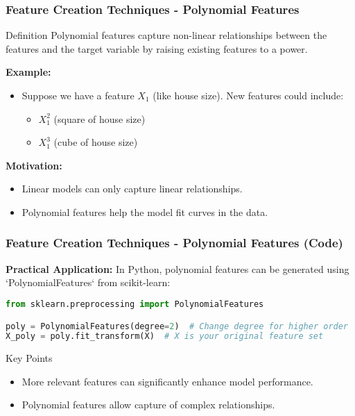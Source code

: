 \documentclass[aspectratio=169]{beamer}
\begin{document}
\begin{frame}[fragile]
    \frametitle{Feature Creation Techniques - Polynomial Features}
    \begin{block}{Definition}
        Polynomial features capture non-linear relationships between the features and the target variable by raising existing features to a power.
    \end{block}

    \textbf{Example:}
    \begin{itemize}
        \item Suppose we have a feature \(X_1\) (like house size). New features could include:
        \begin{itemize}
            \item \(X_1^2\) (square of house size)
            \item \(X_1^3\) (cube of house size)
        \end{itemize}
    \end{itemize}

    \textbf{Motivation:}
    \begin{itemize}
        \item Linear models can only capture linear relationships.
        \item Polynomial features help the model fit curves in the data.
    \end{itemize}
\end{frame}

\begin{frame}[fragile]
    \frametitle{Feature Creation Techniques - Polynomial Features (Code)}
    \textbf{Practical Application:}
    In Python, polynomial features can be generated using `PolynomialFeatures` from scikit-learn:

    \begin{lstlisting}[language=Python]
from sklearn.preprocessing import PolynomialFeatures

poly = PolynomialFeatures(degree=2)  # Change degree for higher order
X_poly = poly.fit_transform(X)  # X is your original feature set
    \end{lstlisting}

    \begin{block}{Key Points}
        \begin{itemize}
            \item More relevant features can significantly enhance model performance.
            \item Polynomial features allow capture of complex relationships.
        \end{itemize}
    \end{block}
\end{frame}
\end{document}
